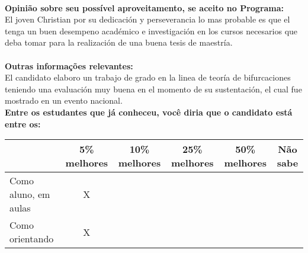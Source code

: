 \documentclass[11pt]{article}
\begin{document}
\\
\textbf{Opinião sobre seu possível aproveitamento, se aceito no Programa:}
\\El joven Christian por su dedicación y perseverancia lo mas probable es que el tenga un buen desempeno académico e investigación en los cursos necesarios que deba tomar para la realización de una buena tesis de maestría.\\ 
\\
\textbf{Outras informações relevantes:} \\El candidato elaboro un trabajo de grado en la linea de teoría de bifurcaciones teniendo una evaluación muy buena en el momento de su sustentación, el cual fue mostrado en un evento nacional.
\\[0.3cm]
\textbf{Entre os estudantes que já conheceu, você diria que o candidato está entre os:}
\\
\begin{tabular}{|l|c|c|c|c|c|}
\hline
 & 5\% melhores & 10\% melhores & 25\% melhores & 50\% melhores & Não sabe \\
\hline
Como aluno, em aulas & X &  &  &  & \\
\hline
Como orientando & X &  &  &  & \\
\hline
\end{tabular}
\end{document}
